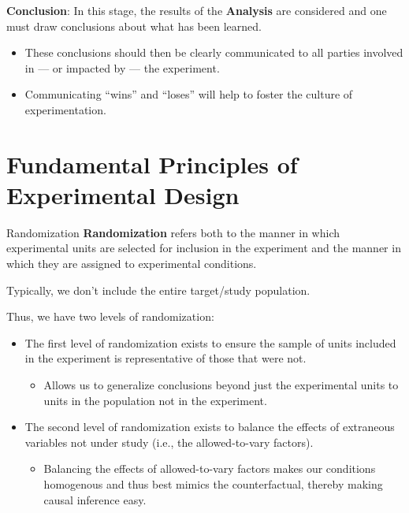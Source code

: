 \begin{framed}
    \textbf{Conclusion}: In this stage, the results of the \textbf{Analysis} are considered
    and one must draw conclusions about what has been learned.
    \begin{itemize}
        \item These conclusions should then be clearly communicated to all parties involved
              in --- or impacted by --- the experiment.
        \item Communicating ``wins'' and ``loses'' will help to foster the culture
              of experimentation.
    \end{itemize}
\end{framed}
\section{Fundamental Principles of Experimental Design}
\begin{Definition}{Randomization}{}
    \textbf{Randomization} refers both to the manner in which experimental units
    are selected for inclusion in the experiment and the manner in which they
    are assigned to experimental conditions.
\end{Definition}
\begin{Remark}{}{}
    Typically, we don't include the entire target/study population.
\end{Remark}
Thus, we have two levels of randomization:
\begin{itemize}
    \item The first level of randomization exists to ensure the sample of units included in
          the experiment is representative of those that were not.
          \begin{itemize}
              \item Allows us to generalize conclusions beyond just the experimental units to units
                    in the population not in the experiment.
          \end{itemize}
    \item The second level of randomization exists to balance the effects of extraneous variables
          not under study (i.e., the allowed-to-vary factors).
          \begin{itemize}
              \item Balancing the effects of allowed-to-vary factors makes our conditions homogenous
                    and thus best mimics the counterfactual, thereby making causal inference easy.
          \end{itemize}
\end{itemize}
